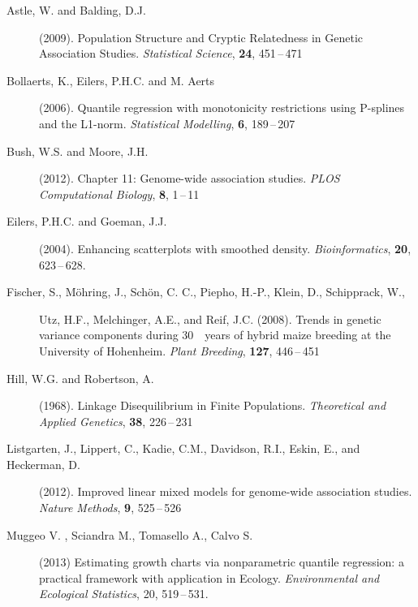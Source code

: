 \documentclass[twoside]{report}
\begin{document}
\begin{description}
\item[Astle, W. and Balding, D.J.] (2009).
		Population Structure and Cryptic Relatedness in Genetic Association Studies.
		{\it Statistical Science}, {\bf 24}, 451\,--\,471
\item[Bollaerts, K., Eilers, P.H.C. and M. Aerts] (2006). Quantile regression with monotonicity restrictions using P-splines and the L1-norm. {\it Statistical Modelling}, {\bf 6}, 189\,--\,207 
\item[Bush, W.S. and Moore, J.H.] (2012).
		Chapter 11: Genome-wide association studies.
		{\it PLOS Computational Biology}, {\bf 8}, 1\,--\,11

\item[Eilers, P.H.C. and Goeman, J.J.] (2004).
	Enhancing scatterplots with smoothed density.
	{\it Bioinformatics}, {\bf 20}, 623\,--\,628.

\item[Fischer, S., M\"{o}hring, J., Sch\"{o}n, C. C., Piepho, H.-P., Klein, D., Schipprack, W.,] {Utz, H.F., Melchinger, A.E., and Reif, J.C.} (2008).
		Trends in genetic variance components during 30 years of hybrid maize breeding at the University of Hohenheim.
		{\it Plant Breeding}, {\bf 127}, 446\,--\,451
\item[Hill, W.G. and Robertson, A.] (1968).
		Linkage Disequilibrium in Finite Populations.
		{\it Theoretical and Applied Genetics}, {\bf 38}, 226\,--\,231		
\item[Listgarten, J., Lippert, C., Kadie, C.M., Davidson, R.I., Eskin, E., and Heckerman, D.] (2012). 
		Improved linear mixed models for genome-wide association studies.
		{\it Nature Methods}, {\bf 9}, 525\,--\,526
		
\item [Muggeo V. , Sciandra M., Tomasello A., Calvo S.] (2013) 
Estimating growth charts via 		
		nonparametric quantile regression: a practical framework with application in Ecology. 
		{\it Environmental and Ecological Statistics}, 20, 519\,--\,531. 		

\end{description}
\end{document}
